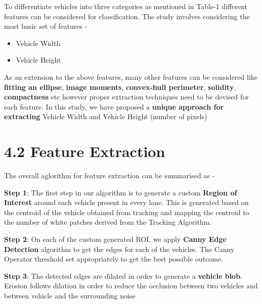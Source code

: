 \documentclass[a4paper,12pt]{article}
\begin{document}
To differentiate vehicles into three categories as mentioned in Table-1 different features can be considered for classification. The study involves considering the most basic set of features -

\begin{itemize}
\setlength{\itemindent}{.2in}
\item Vehicle Width
\item Vehicle Height
\end{itemize}

\begin{flushleft}
As an extension to the above features, many other features can be considered like \textbf{fitting an ellipse}, \textbf{image moments}, \textbf{convex-hull perimeter}, \textbf{solidity}, \textbf{compactness} etc however proper extraction techniques need to be devised for each feature. In this study, we have proposed a \textbf{unique approach for extracting} Vehicle Width and Vehicle Height (number of pixels)
\end{flushleft}

\section*{\large 4.2 Feature Extraction}
\vspace{0.1in}

\begin{flushleft}
The overall aglorithm for feature extraction can be summarised as -
\end{flushleft}

\begin{flushleft}
\textbf{Step 1}: The first step in our algorithm is to generate a custom \textbf{Region of Interest} around each vehicle present in every lane. This is generated based on the centroid of the vehicle obtained from tracking and mapping the centroid to the number of white patches derived from the Tracking Algorithm.
\end{flushleft}

\begin{flushleft}
\textbf{Step 2}: On each of the custom generated ROI, we apply \textbf{Canny Edge Detection} algorithm to get the edges for each of the vehicles. The Canny Operator threshold set appropriately to get the best possible outcome.
\end{flushleft}

\begin{flushleft}
\textbf{Step 3}: The detected edges are dilated in order to generate a \textbf{vehicle blob}. Erosion follows dilation in order to reduce the occlusion between two vehicles and between vehicle and the surrounding noise
\end{flushleft}
\end{document}
